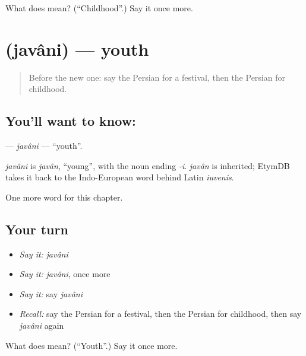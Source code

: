 \begin{tcolorbox}[breakable,colback=teal!4,colframe=teal!35!black,title={Before you move on}]
What does  mean? (\textquotedblleft{}Childhood\textquotedblright{}.) Say it once more.
\end{tcolorbox}
\section[\texorpdfstring{\fa{جوانی} (javâni)}{جوانی (javâni)}]{ (javâni) — youth}

\label{lesson:FA-C264-javani}



\begin{quote}
Before the new one: say the Persian for a festival, then the Persian for childhood.
\end{quote}

\subsection*{You'll want to know: }
\textbf{} — \emph{javâni} — \textquotedblleft{}youth\textquotedblright{}.

\begin{cousinweb}
\emph{javâni} is \emph{javân}, \textquotedblleft{}young\textquotedblright{}, with the noun ending \emph{-i}. \emph{javân} is inherited; EtymDB takes it back to the Indo-European word behind Latin \emph{iuvenis}.
\end{cousinweb}

\begin{grammarlens}[title={What you've built}]
One more word for this chapter.
\end{grammarlens}

\subsection*{Your turn}
\begin{itemize}
\raggedright
  \item \emph{Say it:} \emph{javâni}
  \item \emph{Say it:} \emph{javâni}, once more
  \item \emph{Say it:} say \emph{javâni}
  \item \emph{Recall:} say the Persian for a festival, then the Persian for childhood, then say \emph{javâni} again
\end{itemize}

\begin{tcolorbox}[breakable,colback=teal!4,colframe=teal!35!black,title={Before you move on}]
What does  mean? (\textquotedblleft{}Youth\textquotedblright{}.) Say it once more.
\end{tcolorbox}
